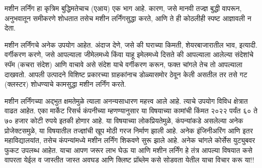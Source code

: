 मशीन लर्निंग हा कृत्रिम बुद्धिमतेचाच (एआय) एक भाग आहे. कारण, जसे मानवी तज्ज्ञ बुद्धी वापरून, अनुभवातून समीकरणे शोधतात तसेच मशीन लर्निंगसुद्धा करते, आणि ते ही कोठलीही स्पष्ट आज्ञावली न देता.

मशीन लर्निंगचे अनेक उपयोग आहेत. अंदाज देणे, जसे की  घराच्या किमती, शेयरबाजारातील भाव, इत्यादी. वर्गीकरण करणे, जसे आपल्याला जीमेलमध्ये किंवा याहू इमेलमध्ये दिसते की आपल्याला आलेल्या संदेशांचे स्पॅम (कचरा संदेश) आणि वाचावे असे संदेश याचे वर्गीकरण करून, फक्त चांगले तेच तो आपल्याला दाखवतो. आपली उत्पादने विशिष्ट प्रकारच्या ग्राहकांनाच डोळ्यासमोर ठेवून केली असतील तर तसे गट (क्लस्टर) शोधण्याचे कामसुद्धा मशीन लर्निंग करते.

मशीन लर्निंगच्या अद्भुत क्षमतेमुळे त्याला अनन्यसाधारण महत्त्व आले आहे. त्याचे उपयोग विविध क्षेत्रात वाढत आहेत. एका मार्केट रिसर्च कंपनीच्या म्हणण्यानुसार या विषयाच्या कामांची किंमत २०२२ पर्यंत ६० ते ७० हजार कोटी रुपये इतकी होणार आहे. या विषयाच्या लोकप्रियतेमुळे, कंपन्यांकडे असलेल्या अनेक प्रोजेक्टसमुळे, या विषयातील तज्ज्ञांची खूप मोठी गरज निर्माण झाली आहे. अनेक इंजिनीअरिंग आणि इतर महाविद्यालयांत, तसेच कंपन्यांमध्ये मशीन लर्निंग शिकवणे सुरू झाले आहे. अनेक चांगले कोर्सेस युट्युबवर फुकट उपलब्ध आहेत. याचा आपण जरूर लाभ घेऊ या आणि मशीन लर्निंग हे तंत्र आपल्या विषयात कसे वापरता येईल व जास्तीत जास्त अवघड आणि क्लिष्ट प्रॉब्लेम कसे सोडवता येतील याचा विचार करू या!!